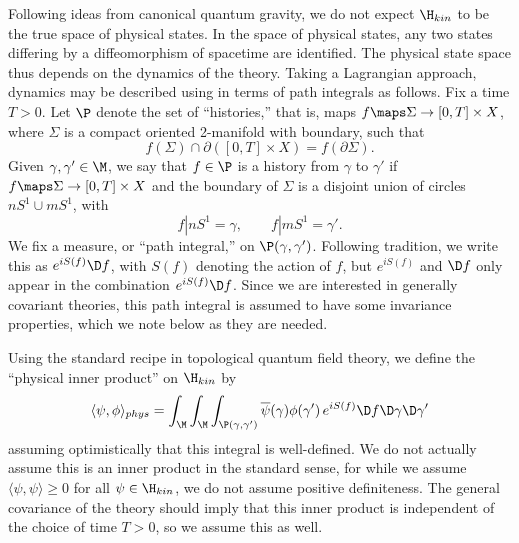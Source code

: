 Following ideas from canonical quantum gravity, we do not expect $\H_{kin}$
to be the true space of physical states.   In the space of physical states,
any two states differing by a diffeomorphism of spacetime are identified.
The physical state space thus depends on the dynamics of the theory.
Taking a Lagrangian approach, dynamics may be described using in terms of
path integrals as follows.   Fix a time $T > 0$.  Let $\P$ denote the set
of ``histories,'' that is, maps $f \maps \Sigma \to [0,T] \times X$, where
$\Sigma$ is a compact oriented 2-manifold with boundary, such that
\[       f(\Sigma) \cap \partial([0,T] \times X) = f(\partial\Sigma) .\]
Given
$\gamma,\gamma' \in \M$, we say that $f \in \P$ is a history from $\gamma$
to $\gamma'$ if $f \maps \Sigma \to [0,T] \times X$ and the boundary of
$\Sigma$ is a disjoint union of circles $nS^1 \cup mS^1$, with
 \[          f|nS^1 = \gamma ,\qquad f|mS^1 = \gamma' .\]
We fix a measure, or ``path
integral,'' on $\P(\gamma,\gamma')$.  Following tradition, we write this as
$ e^{iS(f)} \D f$, with $S(f)$ denoting the action of $f$, but $e^{iS(f)}$
and $\D f$ only appear in the combination $ e^{iS(f)}\D f$.  Since we are
interested in generally covariant theories, this path integral is assumed
to have some invariance properties, which we note below as they are needed.

Using the standard recipe in topological quantum field theory, we define
the ``physical inner product'' on $\H_{kin}$ by
\[ \langle \psi,\phi \rangle_{phys} = \int_{\M} \int_{\M}
 \int_{\P(\gamma,\gamma')}
\overline\psi(\gamma) \phi(\gamma') \, e^{iS(f)} \D f \D\gamma \D\gamma'\]
assuming optimistically that this integral is well-defined.
We do not actually assume this is an inner product in the standard
sense, for while we assume
$\langle \psi,\psi \rangle \ge 0$ for all $\psi \in \H_{kin}$, we do not
assume positive definiteness.
The general covariance of the theory should imply that this inner
product is independent of the choice of time $T > 0$, so we assume this
as well.

